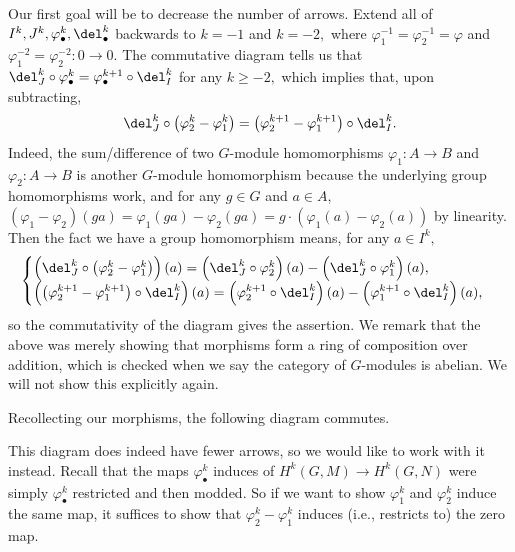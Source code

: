 Our first goal will be to decrease the number of arrows. Extend all of $I^k,J^k,\varphi^k_\bullet,\del_\bullet^k$ backwards to $k=-1$ and $k=-2,$ where $\varphi_1^{-1}=\varphi_2^{-1}=\varphi$ and $\varphi_1^{-2}=\varphi_2^{-2}:0\to 0.$ The commutative diagram tells us that $\del_J^k\circ\varphi_\bullet^k=\varphi_\bullet^{k+1}\circ\del_I^k$ for any $k\ge-2,$ which implies that, upon subtracting,
\[\del_J^k\circ\left(\varphi_2^k-\varphi_1^k\right)=\left(\varphi_2^{k+1}-\varphi_1^{k+1}\right)\circ\del_I^k.\]
Indeed, the sum/difference of two $G$-module homomorphisms $\varphi_1:A\to B$ and $\varphi_2:A\to B$ is another $G$-module homomorphism because the underlying group homomorphisms work, and for any $g\in G$ and $a\in A,$ $(\varphi_1-\varphi_2)(ga)=\varphi_1(ga)-\varphi_2(ga)=g\cdot(\varphi_1(a)-\varphi_2(a))$ by linearity. Then the fact we have a group homomorphism means, for any $a\in I^k,$
\[\begin{cases}
    \left(\del_J^k\circ\left(\varphi_2^k-\varphi_1^k\right)\right)(a)=\left(\del_J^k\circ\varphi_2^k\right)(a)-\left(\del_J^k\circ\varphi_1^k\right)(a), \\
    \left(\left(\varphi_2^{k+1}-\varphi_1^{k+1}\right)\circ\del_I^k\right)(a)=\left(\varphi_2^{k+1}\circ\del_I^k\right)(a)-\left(\varphi_1^{k+1}\circ\del_I^k\right)(a),
\end{cases}\]
so the commutativity of the diagram gives the assertion. We remark that the above was merely showing that morphisms form a ring of composition over addition, which is checked when we say the category of $G$-modules is abelian. We will not show this explicitly again.

Recollecting our morphisms, the following diagram commutes.
\begin{center}
\end{center}
This diagram does indeed have fewer arrows, so we would like to work with it instead. Recall that the maps $\varphi_\bullet^k$ induces of $H^k(G,M)\to H^k(G,N)$ were simply $\varphi_\bullet^k$ restricted and then modded. So if we want to show $\varphi_1^k$ and $\varphi_2^k$ induce the same map, it suffices to show that $\varphi_2^k-\varphi_1^k$ induces (i.e., restricts to) the zero map.

